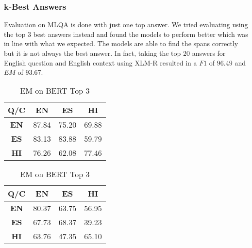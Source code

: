 \documentclass[12pt]{article}   %
\begin{document}
\subsubsection{k-Best Answers}
Evaluation on MLQA is done with just one top answer. We tried evaluating using the top 3 best answers instead and found the models to perform better which was in line with what we expected. The models are able to find the spans correctly but it is not always the best answer. In fact, taking the top 20 answers for English question and English context using XLM-R resulted in a $F1$ of $96.49$ and $EM$ of $93.67$.
 \begin{table}[H]
        \begin{minipage}{0.5\textwidth}
            \centering
		\begin{tabular}{|c|c|c|c|}
			\hline
 			\textbf{Q/C} &  \textbf{EN} &  \textbf{ES} &  \textbf{HI} \\
			\hline
			 \textbf{EN} & 87.84 & 75.20 & 69.88 \\
			\hline
			\textbf{ES} & 83.13 &  83.88 & 59.79 \\
			\hline
			\textbf{HI} & 76.26 & 62.08 & 77.46 \\
			\hline
		\end{tabular}
		\caption{F1 on BERT Top 3}
	\end{minipage}%
        \hfill
	\begin{minipage}{0.5\textwidth}
         	\centering
			\begin{tabular}{|c|c|c|c|}
				\hline
				 \textbf{Q/C} &  \textbf{EN} &  \textbf{ES} &  \textbf{HI} \\
				\hline
				\textbf{EN} & 80.37 & 63.75 & 56.95 \\
				 \hline
				\textbf{ES} & 67.73 & 68.37 & 39.23 \\
				\hline
				 \textbf{HI} & 63.76 & 47.35 & 65.10\\
				 \hline
			\end{tabular}
			\caption{EM on BERT Top 3}
	\end{minipage}%
\end{table}
\end{document}
